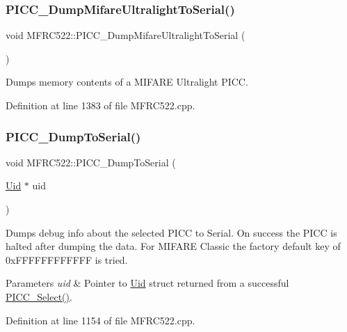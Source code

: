 \subsubsection{\texorpdfstring{P\+I\+C\+C\+\_\+\+Dump\+Mifare\+Ultralight\+To\+Serial()}{PICC\_DumpMifareUltralightToSerial()}}
{\footnotesize\ttfamily void M\+F\+R\+C522\+::\+P\+I\+C\+C\+\_\+\+Dump\+Mifare\+Ultralight\+To\+Serial (\begin{DoxyParamCaption}{ }\end{DoxyParamCaption})}

Dumps memory contents of a M\+I\+F\+A\+RE Ultralight P\+I\+CC. 

Definition at line 1383 of file M\+F\+R\+C522.\+cpp.

\mbox{\label{class_m_f_r_c522_a6f324d43c6fbbd0e260b171747186037}} 
\subsubsection{\texorpdfstring{P\+I\+C\+C\+\_\+\+Dump\+To\+Serial()}{PICC\_DumpToSerial()}}
{\footnotesize\ttfamily void M\+F\+R\+C522\+::\+P\+I\+C\+C\+\_\+\+Dump\+To\+Serial (\begin{DoxyParamCaption}\item[{\hyperlink{struct_m_f_r_c522_1_1_uid}{Uid} $\ast$}]{uid }\end{DoxyParamCaption})}

Dumps debug info about the selected P\+I\+CC to Serial. On success the P\+I\+CC is halted after dumping the data. For M\+I\+F\+A\+RE Classic the factory default key of 0x\+F\+F\+F\+F\+F\+F\+F\+F\+F\+F\+FF is tried. 
\begin{DoxyParams}{Parameters}
{\em uid} & Pointer to \hyperlink{struct_m_f_r_c522_1_1_uid}{Uid} struct returned from a successful \hyperlink{class_m_f_r_c522_ab40449ac80501db28d25889612bb2db0}{P\+I\+C\+C\+\_\+\+Select()}. \\
\hline
\end{DoxyParams}


Definition at line 1154 of file M\+F\+R\+C522.\+cpp.

\mbox{\label{class_m_f_r_c522_a1217f49a195799e3c55b388f9d378ab3}} 
